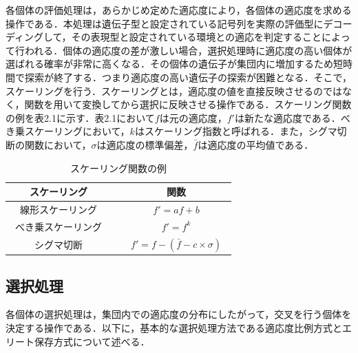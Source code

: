各個体の評価処理は，あらかじめ定めた適応度により，各個体の適応度を求める操作である．本処理は遺伝子型と設定されている記号列を実際の評価型にデコーディングして，その表現型と設定されている環境との適応を判定することによって行われる．個体の適応度の差が激しい場合，選択処理時に適応度の高い個体が選ばれる確率が非常に高くなる．その個体の遺伝子が集団内に増加するため短時間で探索が終了する．つまり適応度の高い遺伝子の探索が困難となる．そこで，スケーリングを行う．スケーリングとは，適応度の値を直接反映させるのではなく，関数を用いて変換してから選択に反映させる操作である．スケーリング関数の例を表2.1に示す．表2.1において$f$は元の適応度，$f'$は新たな適応度である．べき乗スケーリングにおいて，$k$はスケーリング指数と呼ばれる．また，シグマ切断の関数において，$\sigma$は適応度の標準偏差，$\bar{f}$は適応度の平均値である．



\begin{table}[!ht]
\caption{スケーリング関数の例}
\label{tb:sk}
\begin{center}
\begin{tabular}{|c||c|}\hline
スケーリング　&　関数　\\ \hline
線形スケーリング　&　$f'=af+b$　\\ \hline
べき乗スケーリング　&　$f'=f^{k}$　\\ \hline
シグマ切断　&　$f'=f-( \bar{f} - c \times \sigma )$　\\ \hline
\end{tabular}
\end{center}
\end{table}

\newpage


\subsection{選択処理}
\label{sec2.1.3}

各個体の選択処理は，集団内での適応度の分布にしたがって，交叉を行う個体を決定する操作である．以下に，基本的な選択処理方法である適応度比例方式とエリート保存方式について述べる．

